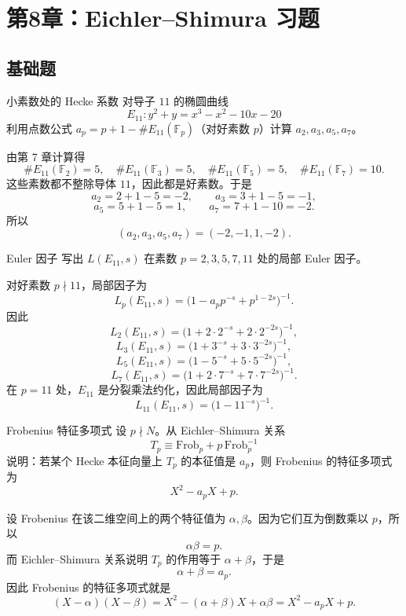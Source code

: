 \chapter{第8章：Eichler--Shimura 习题}
\difficultykey

\section{基础题 \easy}

\begin{problem}{小素数处的 Hecke 系数}
\easy
对导子 $11$ 的椭圆曲线
\[
E_{11}: y^2+y=x^3-x^2-10x-20
\]
利用点数公式 $a_p=p+1-\#E_{11}(\mathbb{F}_p)$（对好素数 $p$）计算 $a_2,a_3,a_5,a_7$。
\end{problem}
\begin{solution}
由第 7 章计算得
\[
\#E_{11}(\mathbb{F}_2)=5,
\quad
\#E_{11}(\mathbb{F}_3)=5,
\quad
\#E_{11}(\mathbb{F}_5)=5,
\quad
\#E_{11}(\mathbb{F}_7)=10.
\]
这些素数都不整除导体 $11$，因此都是好素数。于是
\[
a_2=2+1-5=-2,
\qquad
a_3=3+1-5=-1,
\]
\[
a_5=5+1-5=1,
\qquad
a_7=7+1-10=-2.
\]
所以
\[
(a_2,a_3,a_5,a_7)=(-2,-1,1,-2).
\]
\end{solution}

\begin{problem}{Euler 因子}
\easy
写出 $L(E_{11},s)$ 在素数 $p=2,3,5,7,11$ 处的局部 Euler 因子。
\end{problem}
\begin{solution}
对好素数 $p\nmid 11$，局部因子为
\[
L_p(E_{11},s)=\bigl(1-a_pp^{-s}+p^{1-2s}\bigr)^{-1}.
\]
因此
\[
L_2(E_{11},s)=\bigl(1+2\cdot 2^{-s}+2\cdot 2^{-2s}\bigr)^{-1},
\]
\[
L_3(E_{11},s)=\bigl(1+3^{-s}+3\cdot 3^{-2s}\bigr)^{-1},
\]
\[
L_5(E_{11},s)=\bigl(1-5^{-s}+5\cdot 5^{-2s}\bigr)^{-1},
\]
\[
L_7(E_{11},s)=\bigl(1+2\cdot 7^{-s}+7\cdot 7^{-2s}\bigr)^{-1}.
\]
在 $p=11$ 处，$E_{11}$ 是分裂乘法约化，因此局部因子为
\[
L_{11}(E_{11},s)=\bigl(1-11^{-s}\bigr)^{-1}.
\]
\end{solution}

\begin{problem}{Frobenius 特征多项式}
\easy
设 $p\nmid N$。从 Eichler--Shimura 关系
\[
T_p\equiv \mathrm{Frob}_p+p\,\mathrm{Frob}_p^{-1}
\]
说明：若某个 Hecke 本征向量上 $T_p$ 的本征值是 $a_p$，则 Frobenius 的特征多项式为
\[
X^2-a_pX+p.
\]
\end{problem}
\begin{solution}
设 Frobenius 在该二维空间上的两个特征值为 $\alpha,\beta$。因为它们互为倒数乘以 $p$，所以
\[
\alpha\beta=p.
\]
而 Eichler--Shimura 关系说明 $T_p$ 的作用等于 $\alpha+\beta$，于是
\[
\alpha+\beta=a_p.
\]
因此 Frobenius 的特征多项式就是
\[
(X-\alpha)(X-\beta)=X^2-(\alpha+\beta)X+\alpha\beta=X^2-a_pX+p.
\]
\end{solution}

